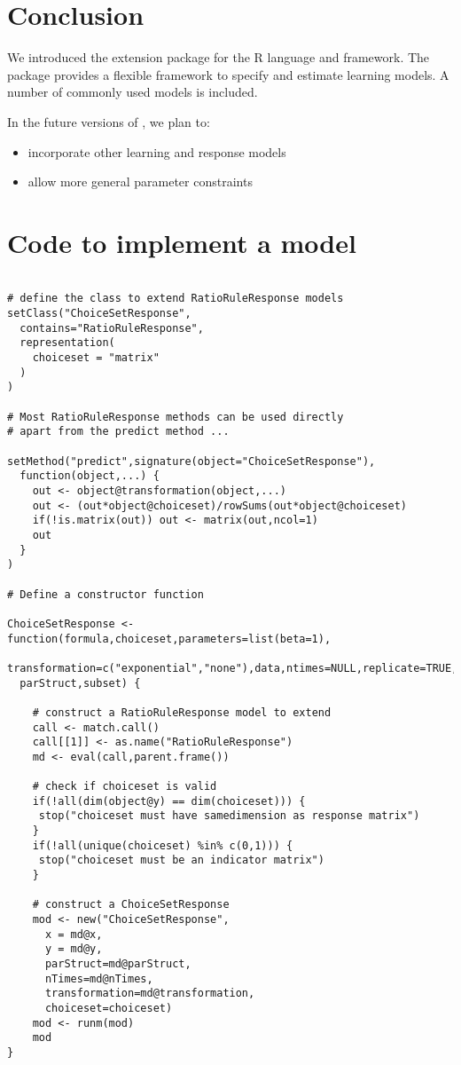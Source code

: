 \documentclass[doc]{apa}
\newcommand{\code}[1]{{\ttfamily{#1}}}
\begin{document}
\section{Conclusion}

We introduced the \code{mcplR} extension package for the R language and framework. The package provides a flexible framework to specify and estimate learning models. A number of commonly used models is included. 

In the future versions of \code{mcplR}, we plan to:
\begin{itemize}
\item incorporate other learning and response models
\item allow more general parameter constraints
\end{itemize}



\appendix

\section{Code to implement a \code{ChoiceSetResponse} model}

\begin{verbatim}

# define the class to extend RatioRuleResponse models
setClass("ChoiceSetResponse",
  contains="RatioRuleResponse",
  representation(
    choiceset = "matrix"
  )
)

# Most RatioRuleResponse methods can be used directly
# apart from the predict method ...
  
setMethod("predict",signature(object="ChoiceSetResponse"),
  function(object,...) {
    out <- object@transformation(object,...)
    out <- (out*object@choiceset)/rowSums(out*object@choiceset)
    if(!is.matrix(out)) out <- matrix(out,ncol=1)
    out
  }
)

# Define a constructor function

ChoiceSetResponse <- function(formula,choiceset,parameters=list(beta=1),
  transformation=c("exponential","none"),data,ntimes=NULL,replicate=TRUE,fixed,
  parStruct,subset) {

    # construct a RatioRuleResponse model to extend
    call <- match.call()
    call[[1]] <- as.name("RatioRuleResponse")
    md <- eval(call,parent.frame())
  
    # check if choiceset is valid
    if(!all(dim(object@y) == dim(choiceset))) {
     stop("choiceset must have samedimension as response matrix")
    }
    if(!all(unique(choiceset) %in% c(0,1))) {
     stop("choiceset must be an indicator matrix")
    }
    
    # construct a ChoiceSetResponse
    mod <- new("ChoiceSetResponse",
      x = md@x,
      y = md@y,
      parStruct=md@parStruct,
      nTimes=md@nTimes,
      transformation=md@transformation,
      choiceset=choiceset)
    mod <- runm(mod)
    mod            
}
\end{verbatim}
\end{document}

